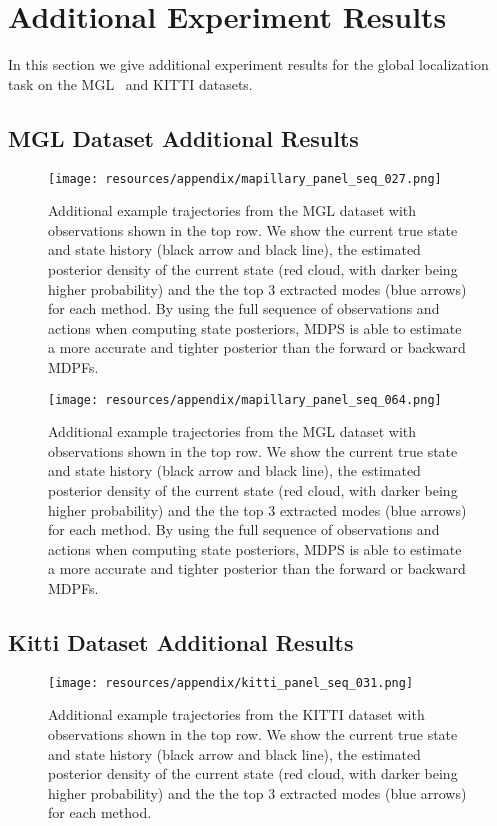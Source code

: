 \newpage
\section{Additional Experiment Results}

    In this section we give additional experiment results for the global localization task on the MGL~\cite{sarlin2023orienternet} and KITTI \cite{Geiger2013IJRRKitti} datasets.  

    \subsection{MGL Dataset Additional Results}
    \begin{figure}[ht]
        \centering
        \texttt{[image: resources/appendix/mapillary\_panel\_seq\_027.png]}
        \caption{\small{Additional example trajectories from the MGL dataset with observations shown in the top row. We show the current true state and state history (black arrow and black line), the estimated posterior density of the current state (red cloud, with darker being higher probability) and the the top 3 extracted modes (blue arrows) for each method. By using the full sequence of observations and actions when computing state posteriors, MDPS is able to estimate a more accurate and tighter posterior than the forward or backward MDPFs.}}
        \label{appx_fig:mapillary_panel_1}
    \end{figure}

    \begin{figure}[ht]
        \centering
        \texttt{[image: resources/appendix/mapillary\_panel\_seq\_064.png]}
        \caption{\small{Additional example trajectories from the MGL dataset with observations shown in the top row. We show the current true state and state history (black arrow and black line), the estimated posterior density of the current state (red cloud, with darker being higher probability) and the the top 3 extracted modes (blue arrows) for each method. By using the full sequence of observations and actions when computing state posteriors, MDPS is able to estimate a more accurate and tighter posterior than the forward or backward MDPFs.}}
        \label{appx_fig:mapillary_panel_2}
    \end{figure}

    \newpage
    \subsection{Kitti Dataset Additional Results}
    \begin{figure}[ht]
        \centering
        \texttt{[image: resources/appendix/kitti\_panel\_seq\_031.png]}
        \caption{\small{Additional example trajectories from the KITTI dataset with observations shown in the top row. We show the current true state and state history (black arrow and black line), the estimated posterior density of the current state (red cloud, with darker being higher probability) and the the top 3 extracted modes (blue arrows) for each method.}}
        \label{appx_fig:kitti_panel_1}
    \end{figure}

